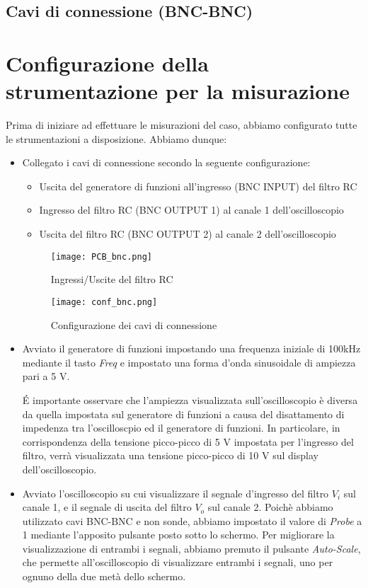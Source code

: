 \subsection*{Cavi di connessione (BNC-BNC)}
\clearpage
\section{Configurazione della strumentazione per la misurazione}
Prima di iniziare ad effettuare le misurazioni del caso, abbiamo configurato tutte le strumentazioni a disposizione. Abbiamo dunque:

\begin{itemize}
    \item Collegato i cavi di connessione secondo la seguente configurazione:
    \begin{itemize}
        \item Uscita del generatore di funzioni all'ingresso (BNC INPUT) del filtro RC
        \item Ingresso del filtro RC (BNC OUTPUT 1) al canale 1 dell'oscilloscopio
        \item Uscita del filtro RC (BNC OUTPUT 2) al canale 2 dell'oscilloscopio
    \end{itemize}
    \begin{figure}[h]
        \centering
        \texttt{[image: PCB\_bnc.png]}
        \caption{Ingressi/Uscite del filtro RC}
        \label{fig:pcb_bnc}
    \end{figure}
    \begin{figure}[h]
        \centering
        \texttt{[image: conf\_bnc.png]}
        \caption{Configurazione dei cavi di connessione}
        \label{fig:conf_bnc}
    \end{figure}
    \FloatBarrier

    \item Avviato il generatore di funzioni impostando una frequenza iniziale di 100kHz mediante il tasto \emph{Freq} e impostato una forma d'onda sinusoidale di ampiezza pari a 5 V.
    
    \'E importante osservare che l'ampiezza visualizzata sull'oscilloscopio è diversa da quella impostata sul generatore di funzioni a causa del disattamento di impedenza tra l'oscilloscpio ed il generatore di funzioni. In particolare, in corrispondenza della tensione picco-picco di 5 V impostata per l'ingresso del filtro, verrà visualizzata una tensione picco-picco di 10 V sul display dell'oscilloscopio.
    \item Avviato l'oscilloscopio su cui visualizzare il segnale d'ingresso del filtro $V_i$ sul canale 1, e il segnale di uscita del filtro $V_o$ sul canale 2.
    Poichè abbiamo utilizzato cavi BNC-BNC e non sonde, abbiamo impostato il valore di \emph{Probe} a 1 mediante l'apposito pulsante posto sotto lo schermo.
    Per migliorare la visualizzazione di entrambi i segnali, abbiamo premuto il pulsante \emph{Auto-Scale}, che permette all'oscilloscopio di visualizzare entrambi i segnali, uno per ognuno della due metà dello schermo.
    

\end{itemize}
